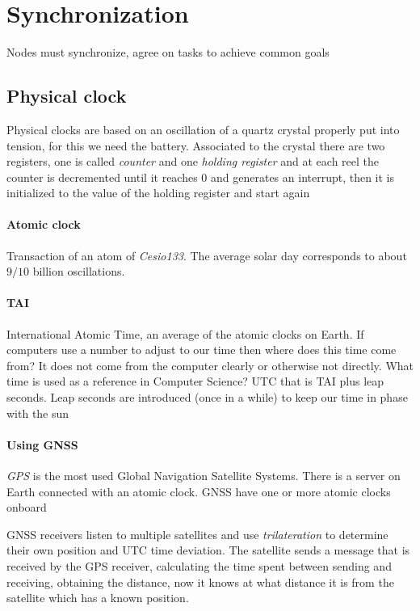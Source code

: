 \section{Synchronization}
Nodes must synchronize, agree on tasks to achieve common goals

\subsection{Physical clock}
Physical clocks are based on an oscillation of a quartz crystal properly put into tension, for this we need the battery. Associated to the crystal there are two registers, one is called \textit{counter} and one \textit{holding register} and at each reel the counter is decremented until it reaches $0$ and generates an interrupt, then it is initialized to the value of the holding register and start again

\paragraph{Atomic clock}
Transaction of an atom of \textit{Cesio133}. The average solar day corresponds to about $9/10$ billion oscillations.

\paragraph{TAI}
International Atomic Time, an average of the atomic clocks on Earth. If computers use a number to adjust to our time then where does this time come from? It does not come from the computer clearly or otherwise not directly. What time is used as a reference in Computer Science? UTC that is TAI plus leap seconds. Leap seconds are introduced (once in a while) to keep our time in phase with the sun

\paragraph{Using GNSS}
\textit{GPS} is the most used Global Navigation Satellite Systems. There is a server on Earth connected with an atomic clock. GNSS have one or more atomic clocks onboard

GNSS receivers listen to multiple satellites and use \textit{trilateration} to determine their own position and UTC time deviation. The satellite sends a message that is received by the GPS receiver, calculating the time spent between sending and receiving, obtaining the distance, now it knows at what distance it is from the satellite which has a known position.

